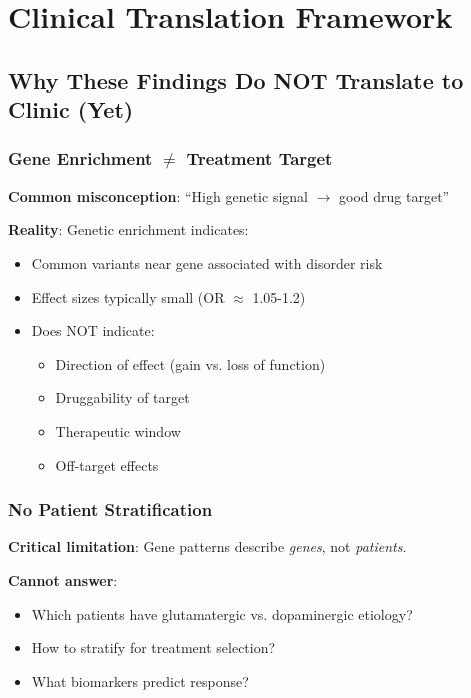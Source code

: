 \documentclass[12pt,letterpaper]{article}
\begin{document}
\section{Clinical Translation Framework}

\subsection{Why These Findings Do NOT Translate to Clinic (Yet)}

\subsubsection{Gene Enrichment $\neq$ Treatment Target}

\textbf{Common misconception}: ``High genetic signal $\rightarrow$ good drug target''

\textbf{Reality}: Genetic enrichment indicates:
\begin{itemize}
    \item Common variants near gene associated with disorder risk
    \item Effect sizes typically small (OR $\approx$ 1.05-1.2)
    \item Does NOT indicate:
    \begin{itemize}
        \item Direction of effect (gain vs. loss of function)
        \item Druggability of target
        \item Therapeutic window
        \item Off-target effects
    \end{itemize}
\end{itemize}

\subsubsection{No Patient Stratification}

\textbf{Critical limitation}: Gene patterns describe \textit{genes}, not \textit{patients}.

\textbf{Cannot answer}:
\begin{itemize}
    \item Which patients have glutamatergic vs. dopaminergic etiology?
    \item How to stratify for treatment selection?
    \item What biomarkers predict response?
\end{itemize}
\end{document}
